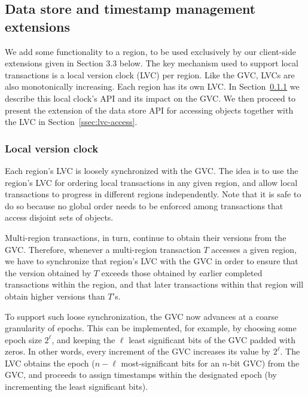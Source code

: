 
\subsection{Data store and timestamp management extensions} \label{ssec:region-clock}

We add some functionality to a region, to be used exclusively by our client-side
extensions given in Section 3.3 below. The key mechanism used to support local
transactions is a local version clock (LVC) per region. Like the GVC, LVCs are
also monotonically increasing. Each region has its
own LVC. In Section~\ref{ssec:lvc} we describe this local clock's API and its impact on
the GVC. We then proceed to present the extension of the data store API for
accessing objects together with the LVC in Section~\ref{ssec:lvc-access}.

\subsubsection{Local version clock} \label{ssec:lvc}


Each region's LVC is loosely synchronized with the GVC. The idea is to use the
region's LVC for ordering local transactions in any given region, and allow
local transactions to progress in different regions independently. Note that it
is safe to do so because no global order needs to be enforced among transactions
that access disjoint sets of objects.

Multi-region transactions, in turn, continue to obtain their versions from the
GVC. Therefore, whenever a multi-region transaction $T$ accesses a given region,
we have to synchronize that region's LVC with the GVC in order to ensure that
the version obtained by $T$ exceeds those obtained by earlier completed
transactions within the region, and that later transactions within that region
will obtain higher versions than $T$'s.

To support such loose synchronization, the GVC now advances at a coarse
granularity of epochs. This can be implemented, for example, by choosing some
epoch size $2^\ell$, and keeping the $\ell$ least significant bits of the GVC padded
with zeros. In other words, every increment of the GVC increases its value by
$2^\ell$.
The LVC obtains the epoch ($n-\ell$ most-significant bits for an $n$-bit GVC) from the
GVC, and proceeds to assign timestamps within the designated epoch (by
incrementing the least significant bits).


